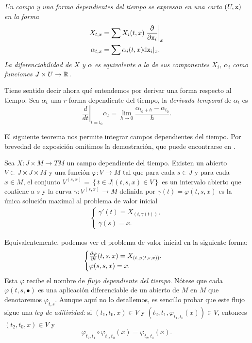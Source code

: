   \begin{obs}
    \em
    Un campo y una forma dependientes del tiempo se expresan en una carta $(U,\mathtt{x})$ en la forma
    \begin{align*}
      X_{t,x} &= \sum X_i(t,x) \left.\frac{\partial}{\partial \mathtt{x}_i}\right|_x \\
      \alpha_{t,x} &= \sum \alpha_i(t,x) \mathrm{d} \mathtt{x}_i |_x.
    \end{align*}
    La diferenciabilidad de $X$ y $\alpha$ es equivalente a la de sus componentes $X_i$, $\alpha_i$ como funciones $J\times U \rightarrow \mathbb{R}$.
  \end{obs}
  Tiene sentido decir ahora qué entendemos por derivar una forma respecto al tiempo. Sea $\alpha_t$ una $r$-forma dependiente del tiempo, la \emph{derivada temporal} de $\alpha_t$ es
    \begin{equation*}
      \left. \frac{d}{dt}\right|_{t=t_0} \alpha_t = \lim_{h\rightarrow 0}\frac{\alpha_{t_0+h}-\alpha_{t_0}}{h}.
    \end{equation*}

    El siguiente teorema nos permite integrar campos dependientes del tiempo. Por brevedad de exposición omitimos la demostración, que puede encontrarse en \cite{lee}.
  \begin{thm}
    Sea $X:J\times M \rightarrow TM$ un campo dependiente del tiempo. Existen un abierto $V\subset J\times J\times M$ y una función $\varphi:V\rightarrow M$ tal que para cada $s\in J$ y para cada $x\in M$, el conjunto $V^{(s,x)}=\left\{ t\in J | (t,s,x) \in V \right\}$ es un intervalo abierto que contiene a $s$ y la curva $\gamma:V^{(s,x)}\rightarrow M$ definida por $\gamma(t)=\varphi(t,s,x)$ es la única solución maximal al problema de valor inicial
    \begin{align*}
      \begin{cases}
      \gamma'(t)=X_{(t,\gamma(t))}, \\
      \gamma(s)=x.
    \end{cases}
    \end{align*}
  \end{thm}
    Equivalentemente, podemos ver el problema de valor inicial en la siguiente forma:
    \begin{align*}
      \begin{cases}
      \frac{\partial \varphi}{\partial t}(t,s,x)=X_{(t,\varphi(t,s,x))}, \\
      \varphi(s,s,x)=x.
    \end{cases}
    \end{align*}
    Esta $\varphi$ recibe el nombre de \emph{flujo dependiente del tiempo}. Nótese que cada $\varphi(t,s,\bullet)$ es una aplicación diferenciable de un abierto de $M$ en $M$ que denotaremos $\varphi_{t,s}$. Aunque aquí no lo detallemos, es sencillo probar que este flujo sigue una \emph{ley de aditividad}: si $(t_1,t_0,x)\in V$ y $(t_2,t_1,\varphi_{t_1,t_0}(x))\in V$, entonces $(t_2,t_0,x)\in V$ y
    \begin{equation*}
      \varphi_{t_2,t_1}\circ \varphi_{t_1,t_0}(x)=\varphi_{t_2,t_0}(x).
    \end{equation*}

